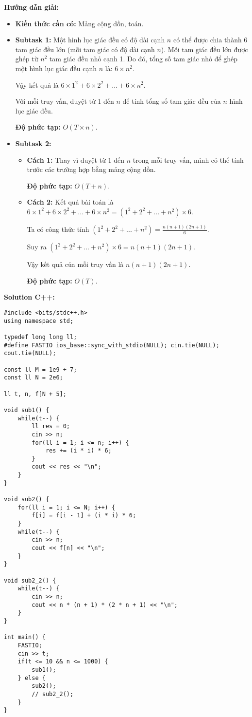 \documentclass[12pt]{scrartcl}  %
\begin{document}
\textbf{Hướng dẫn giải:}
\begin{itemize}
    \item \textbf{Kiến thức cần có:} Mảng cộng dồn, toán.
    \item \textbf{Subtask 1:} Một hình lục giác đều có độ dài cạnh $n$ có thể được chia thành 6
    tam giác đều lớn (mỗi tam giác có độ dài cạnh $n$). Mỗi tam giác đều lớn được
    ghép từ $n^2$ tam giác đều nhỏ cạnh 1. Do đó, tổng số tam giác nhỏ để ghép một hình lục giác đều
    cạnh $n$ là: $6 \times n^2$.
    
    Vậy kết quả là $6 \times 1^2 + 6 \times 2^2 + ... + 6 \times n^2$.

    Với mỗi truy vấn, duyệt từ $1$ đến $n$ để tính tổng số tam giác đều của $n$ hình lục
    giác đều.

    \textbf{Độ phức tạp:} $O(T \times n)$.
    \item \textbf{Subtask 2:} 
    \begin{itemize}
        \item \textbf{Cách 1:} Thay vì duyệt từ $1$ đến $n$ trong mỗi truy vấn, mình có thể
        tính trước các trường hợp bằng mảng cộng dồn.
        
        \textbf{Độ phức tạp:} $O(T + n)$.
        \item \textbf{Cách 2:} Kết quả bài toán là $6 \times 1^2 + 6 \times 2^2 + ... + 6 \times n^2
        = (1^2 + 2^2 + ... + n^2) \times 6$.
        
        Ta có công thức tính $(1^2 + 2^2 + ... + n^2) = \frac{n(n + 1)(2n + 1)}{6}$.

        Suy ra $(1^2 + 2^2 + ... + n^2) \times 6 = n(n + 1)(2n + 1)$.
        
        Vậy kết quả của mỗi truy vấn là $n(n + 1)(2n + 1)$.

        \textbf{Độ phức tạp:} $O(T)$.
    \end{itemize}
\end{itemize}

\textbf{Solution C++:}
\begin{lstlisting}
#include <bits/stdc++.h>
using namespace std;

typedef long long ll;
#define FASTIO ios_base::sync_with_stdio(NULL); cin.tie(NULL); cout.tie(NULL);

const ll M = 1e9 + 7;
const ll N = 2e6;

ll t, n, f[N + 5];

void sub1() {
    while(t--) {
        ll res = 0;
        cin >> n;
        for(ll i = 1; i <= n; i++) {
            res += (i * i) * 6;
        }
        cout << res << "\n";
    }
}

void sub2() {
    for(ll i = 1; i <= N; i++) {
        f[i] = f[i - 1] + (i * i) * 6;
    }
    while(t--) {
        cin >> n;
        cout << f[n] << "\n";
    }
}

void sub2_2() {
    while(t--) {
        cin >> n;
        cout << n * (n + 1) * (2 * n + 1) << "\n";
    }
}

int main() {
    FASTIO;
    cin >> t;
    if(t <= 10 && n <= 1000) {
        sub1();
    } else {
        sub2();
        // sub2_2();
    }
}

\end{lstlisting}
\end{document}
